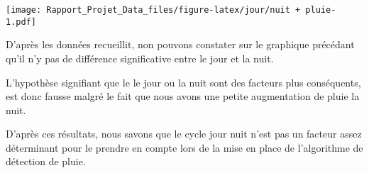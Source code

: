 \documentclass[
]{article}
\newenvironment{Shaded}{\begin{snugshade}}{\end{snugshade}}
\newcommand{\AttributeTok}[1]{\textcolor[rgb]{0.77,0.63,0.00}{#1}}
\newcommand{\DecValTok}[1]{\textcolor[rgb]{0.00,0.00,0.81}{#1}}
\newcommand{\FunctionTok}[1]{\textcolor[rgb]{0.00,0.00,0.00}{#1}}
\newcommand{\NormalTok}[1]{#1}
\newcommand{\OtherTok}[1]{\textcolor[rgb]{0.56,0.35,0.01}{#1}}
\newcommand{\SpecialCharTok}[1]{\textcolor[rgb]{0.00,0.00,0.00}{#1}}
\newcommand{\StringTok}[1]{\textcolor[rgb]{0.31,0.60,0.02}{#1}}
\begin{document}
\begin{Shaded}
\end{Shaded}

\texttt{[image: Rapport\_Projet\_Data\_files/figure-latex/jour/nuit + pluie-1.pdf]}

D'après les données recueillit, non pouvons constater sur le graphique
précédant qu'il n'y pas de différence significative entre le jour et la
nuit.

L'hypothèse signifiant que le le jour ou la nuit sont des facteurs plus
conséquents, est donc fausse malgré le fait que nous avons une petite
augmentation de pluie la nuit.

D'après ces résultats, nous savons que le cycle jour nuit n'est pas un
facteur assez déterminant pour le prendre en compte lors de la mise en
place de l'algorithme de détection de pluie.
\end{document}
